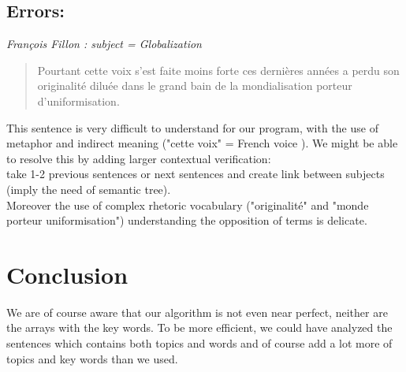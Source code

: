 \documentclass{article}
\begin{document}
\subsection{Errors: }

\emph{François Fillon : subject = Globalization}
\begin{quote}
Pourtant cette voix s’est faite moins forte ces dernières années a perdu son originalité diluée dans le grand bain de la mondialisation porteur d’uniformisation.
\end{quote}
This sentence is very difficult to understand for our program, with the use of metaphor and indirect meaning ("cette voix" = French voice ). We might be able to resolve this by adding larger contextual verification:\\
take 1-2 previous sentences or next sentences and create link between subjects (imply the need of semantic tree).\\
Moreover the use of complex rhetoric vocabulary ("originalité" and "monde porteur uniformisation") understanding the opposition of terms is delicate.

\section{Conclusion}
We are of course aware that our algorithm is not even near perfect, neither are the arrays with the key words. To be more efficient, we could have analyzed the sentences which contains both topics and words and of course add a lot more of topics and key words than we used.
\end{document}
